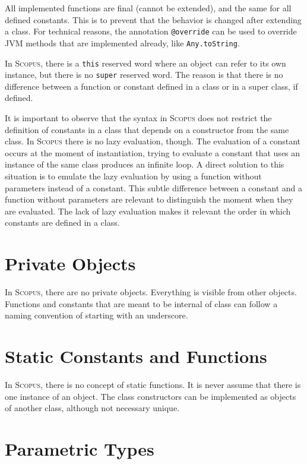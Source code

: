 \documentclass[12pt,a4paper]{book}
\makeatletter
\newcommand{\srccode}[1]{\texttt{{#1}}}
\newcommand{\reservedWord}[1]{{\color{blue}\srccode{#1}}\xspace}
\newcommand{\annotation}[1]{{\color{brown}\srccode{#1}}\xspace}
\newcommand{\sthis}{\reservedWord{this}}
\newcommand{\soverride}{\annotation{@override}}
\newcommand{\Scopus}{\textsc{Scopus}\xspace}
\makeatother
\begin{document}
    All implemented functions are final (cannot be extended), and the same for all defined constants.
    This is to prevent that the behavior is changed after extending a class.
    For technical reasons, the annotation \soverride can be used to override JVM methods that are implemented already, like \srccode{Any.toString}.

    In \Scopus, there is a \sthis reserved word where an object can refer to its own instance, but there is no \srccode{super} reserved word.
    The reason is that there is no difference between a function or constant defined in a class or in a super class, if defined.

    It is important to observe that the syntax in \Scopus does not restrict the definition of constants in a class that depends on a constructor from the same class.
    In \Scopus there is no lazy evaluation, though.
    The evaluation of a constant occurs at the moment of instantiation, trying to evaluate a constant that uses an instance of the same class produces an infinite loop.
    A direct solution to this situation is to emulate the lazy evaluation by using a function without parameters instead of a constant.
    This subtle difference between a constant and a function without parameters are relevant to distinguish the moment when they are evaluated.
    The lack of lazy evaluation makes it relevant the order in which constants are defined in a class.


    \section{Private Objects}

    In \Scopus, there are no private objects.
    Everything is visible from other objects.
    Functions and constants that are meant to be internal of class can follow a naming convention of starting with an underscore.


    \section{Static Constants and Functions}

    In \Scopus, there is no concept of static functions.
    It is never assume that there is one instance of an object.
    The class constructors can be implemented as objects of another class, although not necessary unique.


    \section{Parametric Types}
\end{document}
